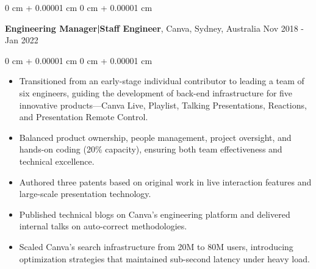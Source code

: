 \documentclass[10pt, letterpaper]{article}
\newenvironment{highlights}{
    \begin{itemize}[
        topsep=0.10 cm,
        parsep=0.10 cm,
        partopsep=0pt,
        itemsep=0pt,
        leftmargin=0 cm + 10pt
    ]
}{
    \end{itemize}
} %
\newenvironment{onecolentry}{
    \begin{adjustwidth}{
        0 cm + 0.00001 cm
    }{
        0 cm + 0.00001 cm
    }
}{
    \end{adjustwidth}
} %
\newenvironment{twocolentry}[2][]{
    \onecolentry
    \def\secondColumn{#2}
    \setcolumnwidth{\fill, 4.5 cm}
    \begin{paracol}{2}
}{
    \switchcolumn \raggedleft \secondColumn
    \end{paracol}
    \endonecolentry
} %
\begin{document}
        \vspace{0.15 cm}

        \begin{twocolentry}{
            Nov 2018 - Jan 2022
        }
            \textbf{Engineering Manager|Staff Engineer}, Canva, Sydney, Australia\end{twocolentry}

        \vspace{0.10 cm}
        \begin{onecolentry}
            \begin{highlights}
                \item Transitioned from an early-stage individual contributor to leading a team of six engineers, guiding the development of back-end infrastructure for five innovative products—Canva Live, Playlist, Talking Presentations, Reactions, and Presentation Remote Control.
                \item Balanced product ownership, people management, project oversight, and hands-on coding (20\% capacity), ensuring both team effectiveness and technical excellence.
                \item Authored three patents based on original work in live interaction features and large-scale presentation technology.
                \item Published technical blogs on Canva's engineering platform and delivered internal talks on auto-correct methodologies.
                \item Scaled Canva's search infrastructure from 20M to 80M users, introducing optimization strategies that maintained sub-second latency under heavy load.
            \end{highlights}
        \end{onecolentry}
\end{document}
